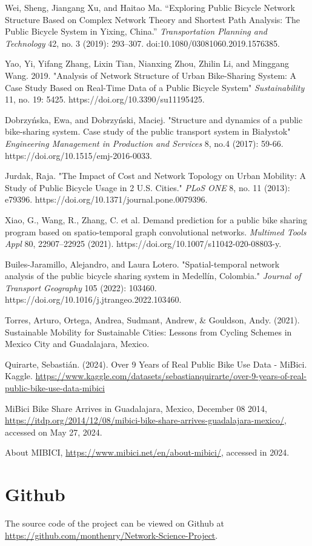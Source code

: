 \documentclass[conference]{IEEEtran}
\begin{document}
\begin{thebibliography}{1}

Wei, Sheng, Jiangang Xu, and Haitao Ma. “Exploring Public Bicycle Network Structure Based on Complex Network Theory and Shortest Path Analysis: The Public Bicycle System in Yixing, China.” \textit{Transportation Planning and Technology} 42, no. 3 (2019): 293–307. doi:10.1080/03081060.2019.1576385.

Yao, Yi, Yifang Zhang, Lixin Tian, Nianxing Zhou, Zhilin Li, and Minggang Wang. 2019. "Analysis of Network Structure of Urban Bike-Sharing System: A Case Study Based on Real-Time Data of a Public Bicycle System" \textit{Sustainability} 11, no. 19: 5425. https://doi.org/10.3390/su11195425.

Dobrzyńska, Ewa, and Dobrzyński, Maciej. "Structure and dynamics of a public bike-sharing system. Case study of the public transport system in Białystok" \textit{Engineering Management in Production and Services} 8, no.4 (2017): 59-66. https://doi.org/10.1515/emj-2016-0033.

Jurdak, Raja. "The Impact of Cost and Network Topology on Urban Mobility: A Study of Public Bicycle Usage in 2 U.S. Cities." \textit{PLoS ONE} 8, no. 11 (2013): e79396. https://doi.org/10.1371/journal.pone.0079396.

Xiao, G., Wang, R., Zhang, C. et al. Demand prediction for a public bike sharing program based on spatio-temporal graph convolutional networks. \textit{Multimed Tools Appl} 80, 22907–22925 (2021). https://doi.org/10.1007/s11042-020-08803-y.

Builes-Jaramillo, Alejandro, and Laura Lotero. "Spatial-temporal network analysis of the public bicycle sharing system in Medellín, Colombia." \textit{Journal of Transport Geography} 105 (2022): 103460. https://doi.org/10.1016/j.jtrangeo.2022.103460.

Torres, Arturo, Ortega, Andrea, Sudmant, Andrew, \& Gouldson, Andy. (2021). Sustainable Mobility for Sustainable Cities: Lessons from Cycling Schemes in Mexico City and Guadalajara, Mexico.

Quirarte, Sebastián. (2024). Over 9 Years of Real Public Bike Use Data - MiBici. Kaggle. \url{https://www.kaggle.com/datasets/sebastianquirarte/over-9-years-of-real-public-bike-use-data-mibici}

MiBici Bike Share Arrives in Guadalajara, Mexico, December 08 2014, \url{https://itdp.org/2014/12/08/mibici-bike-share-arrives-guadalajara-mexico/}, accessed on May 27, 2024.

About MIBICI, \url{https://www.mibici.net/en/about-mibici/}, accessed in 2024.

\end{thebibliography}

\section{Github}

The source code of the project can be viewed on Github at \url{https://github.com/monthenry/Network-Science-Project}.
\end{document}
